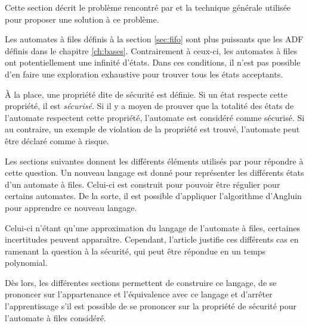 Cette section décrit le problème rencontré par \cite{Vardhan04} et la technique générale utilisée pour proposer une solution à ce problème.

Les automates à files définis à la section \ref{sec:fifo} sont plus puissants que les ADF définis dans le chapitre \ref{ch:bases}. Contrairement à ceux-ci, les automates à files ont potentiellement une infinité d'états. Dans ces conditions, il n'est pas possible d'en faire une exploration exhaustive pour trouver tous les états acceptants.

À la place, une propriété dite de sécurité est définie. Si un état respecte cette propriété, il est \emph{sécurisé}. Si il y a moyen de prouver que la totalité des états de l'automate respectent cette propriété, l'automate est considéré comme sécurisé. Si au contraire, un exemple de violation de la propriété est trouvé, l'automate peut être déclaré comme à risque.

Les sections suivantes donnent les différents éléments utilisés par \cite{Vardhan04} pour répondre à cette question. Un nouveau langage est donné pour représenter les différents états d'un automate à files. Celui-ci est construit pour pouvoir être régulier pour certains automates. De la sorte, il est possible d'appliquer l'algorithme d'Angluin pour apprendre ce nouveau langage.

Celui-ci n'étant qu'une approximation du langage de l'automate à files, certaines incertitudes peuvent apparaître. Cependant, l'article justifie ces différents cas en ramenant la question à la sécurité, qui peut être répondue en un temps polynomial.

Dès lors, les différentes sections permettent de construire ce langage, de se prononcer sur l'appartenance et l'équivalence avec ce langage et d'arrêter l'apprentissage s'il est possible de se prononcer sur la propriété de sécurité pour l'automate à files considéré.
